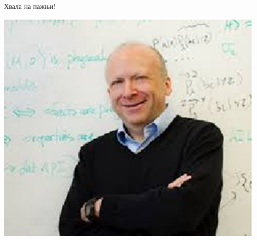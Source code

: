 \documentclass{beamer}
\begin{document}
\begin{frame}
\frametitle{}
\begin{center}
Хвала на пажњи!
\end{center}
\begin{center}
\includegraphics[scale=0.5]{index.eps}
\end{center}
\end{frame}
\end{document}
